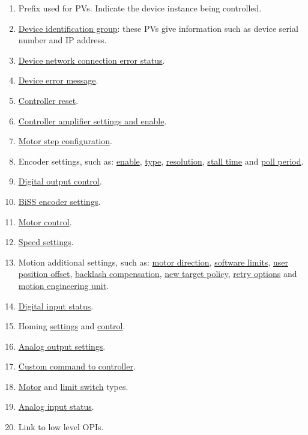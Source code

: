 \documentclass[openany]{article}
\begin{document}
    \begin{enumerate}
        \item Prefix used for PVs. Indicate the device instance being controlled.
        \item \hyperlink{pv:controller-addr-mon}{Device identification group}: these PVs give information such as device serial number and IP address.
        \item \hyperlink{pv:comm-err-mon}{Device network connection error status}.
        \item \hyperlink{pv:controller-err-mon}{Device error message}.
        \item \hyperlink{pv:rst-cmd}{Controller reset}.
        \item \hyperlink{pv:amp-enbl}{Controller amplifier settings and enable}.
        \item \hyperlink{pv:mtr-mres}{Motor step configuration}.
        \item Encoder settings, such as: \hyperlink{pv:mtr-ueip}{enable}, \hyperlink{pv:main-enc-type}{type}, \hyperlink{pv:mtr-eres}{resolution}, \hyperlink{pv:estall}{stall time} and \hyperlink{pv:poll-period}{poll period}.
        \item \hyperlink{pv:dig-out-0}{Digital output control}.
        \item \hyperlink{pv:biss-crc-mon}{BiSS encoder settings}.
        \item \hyperlink{pv:high-lim-sw-mon}{Motor control}.
        \item \hyperlink{pv:mtr-velo}{Speed settings}.
        \item Motion additional settings, such as: \hyperlink{pv:mtr-dir}{motor direction}, \hyperlink{pv:mtr-hlm}{software limits}, \hyperlink{pv:mtr-off}{user position offset}, \hyperlink{pv:mtr-bdst}{backlash compensation}, \hyperlink{pv:mtr-ntm}{new target policy}, \hyperlink{pv:mtr-rtry}{retry options} and \hyperlink{pv:mtr-egu}{motion engineering unit}.
        \item \hyperlink{pv:dig-in-0}{Digital input status}.
        \item Homing \hyperlink{pv:home-sw-type}{settings} and \hyperlink{pv:mtr-homf}{control}.
        \item \hyperlink{pv:analog-out-0}{Analog output settings}.
        \item \hyperlink{pv:send-cmd}{Custom command to controller}.
        \item \hyperlink{pv:mtr-type}{Motor} and \hyperlink{pv:lim-sw-type}{limit switch} types.
        \item \hyperlink{pv:analog-in-0-mon}{Analog input status}.
        \item Link to low level OPIs.
    \end{enumerate}
    
\end{document}

